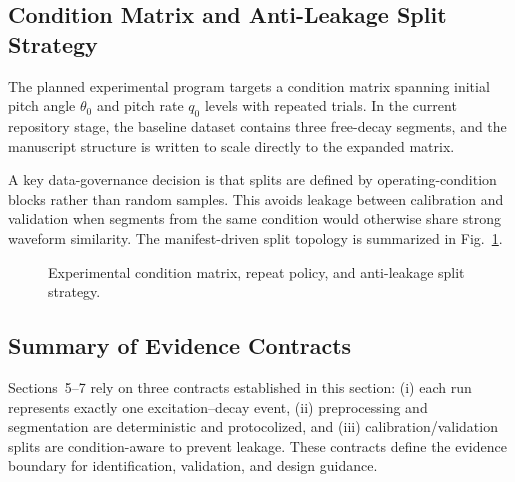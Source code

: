 \subsection{Condition Matrix and Anti-Leakage Split Strategy}

The planned experimental program targets a condition matrix spanning initial pitch angle $\theta_0$ and pitch rate $q_0$ levels with repeated trials. In the current repository stage, the baseline dataset contains three free-decay segments, and the manuscript structure is written to scale directly to the expanded matrix.

A key data-governance decision is that splits are defined by operating-condition blocks rather than random samples. This avoids leakage between calibration and validation when segments from the same condition would otherwise share strong waveform similarity. The manifest-driven split topology is summarized in Fig.~\ref{fig:condition-matrix}.

\begin{figure}[htbp]
  \centering
  \caption{Experimental condition matrix, repeat policy, and anti-leakage split strategy.}
  \label{fig:condition-matrix}
\end{figure}

\subsection{Summary of Evidence Contracts}

Sections~5--7 rely on three contracts established in this section: (i) each run represents exactly one excitation--decay event, (ii) preprocessing and segmentation are deterministic and protocolized, and (iii) calibration/validation splits are condition-aware to prevent leakage. These contracts define the evidence boundary for identification, validation, and design guidance.
